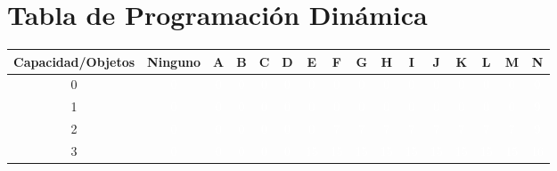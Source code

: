 \documentclass{article}
\begin{document}
\section*{Tabla de Programación Dinámica}
\begin{center}
\scriptsize
\begin{tabular}{|c|c|c|c|c|c|c|c|c|c|c|c|c|c|c|c|}
\hline
Capacidad/Objetos & Ninguno & A & B & C & D & E & F & G & H & I & J & K & L & M & N \\ \hline
0 & \cellcolor{rojo}\textcolor{white}{0} & \cellcolor{rojo}\textcolor{white}{0} & \cellcolor{rojo}\textcolor{white}{0} & \cellcolor{rojo}\textcolor{white}{0} & \cellcolor{rojo}\textcolor{white}{0} & \cellcolor{rojo}\textcolor{white}{0} & \cellcolor{rojo}\textcolor{white}{0} & \cellcolor{rojo}\textcolor{white}{0} & \cellcolor{rojo}\textcolor{white}{0} & \cellcolor{rojo}\textcolor{white}{0} & \cellcolor{rojo}\textcolor{white}{0} & \cellcolor{rojo}\textcolor{white}{0} & \cellcolor{rojo}\textcolor{white}{0} & \cellcolor{rojo}\textcolor{white}{0} & \cellcolor{rojo}\textcolor{white}{0} \\ \hline
1 & \cellcolor{rojo}\textcolor{white}{0} & \cellcolor{rojo}\textcolor{white}{0} & \cellcolor{rojo}\textcolor{white}{0} & \cellcolor{rojo}\textcolor{white}{0} & \cellcolor{rojo}\textcolor{white}{0} & \cellcolor{rojo}\textcolor{white}{0} & \cellcolor{rojo}\textcolor{white}{0} & \cellcolor{rojo}\textcolor{white}{0} & \cellcolor{rojo}\textcolor{white}{0} & \cellcolor{rojo}\textcolor{white}{0} & \cellcolor{rojo}\textcolor{white}{0} & \cellcolor{rojo}\textcolor{white}{0} & \cellcolor{rojo}\textcolor{white}{0} & \cellcolor{rojo}\textcolor{white}{0} & \cellcolor{verde}\textcolor{white}{9} \\ \hline
2 & \cellcolor{rojo}\textcolor{white}{0} & \cellcolor{rojo}\textcolor{white}{0} & \cellcolor{rojo}\textcolor{white}{0} & \cellcolor{rojo}\textcolor{white}{0} & \cellcolor{rojo}\textcolor{white}{0} & \cellcolor{rojo}\textcolor{white}{0} & \cellcolor{verde}\textcolor{white}{7} & \cellcolor{rojo}\textcolor{white}{7} & \cellcolor{rojo}\textcolor{white}{7} & \cellcolor{rojo}\textcolor{white}{7} & \cellcolor{rojo}\textcolor{white}{7} & \cellcolor{rojo}\textcolor{white}{7} & \cellcolor{rojo}\textcolor{white}{7} & \cellcolor{rojo}\textcolor{white}{7} & \cellcolor{verde}\textcolor{white}{9} \\ \hline
3 & \cellcolor{rojo}\textcolor{white}{0} & \cellcolor{rojo}\textcolor{white}{0} & \cellcolor{rojo}\textcolor{white}{0} & \cellcolor{rojo}\textcolor{white}{0} & \cellcolor{rojo}\textcolor{white}{0} & \cellcolor{verde}\textcolor{white}{15} & \cellcolor{rojo}\textcolor{white}{15} & \cellcolor{rojo}\textcolor{white}{15} & \cellcolor{rojo}\textcolor{white}{15} & \cellcolor{rojo}\textcolor{white}{15} & \cellcolor{rojo}\textcolor{white}{15} & \cellcolor{rojo}\textcolor{white}{15} & \cellcolor{rojo}\textcolor{white}{15} & \cellcolor{rojo}\textcolor{white}{15} & \cellcolor{verde}\textcolor{white}{16} \\ \hline

\end{tabular}
\end{center}
\end{document}
